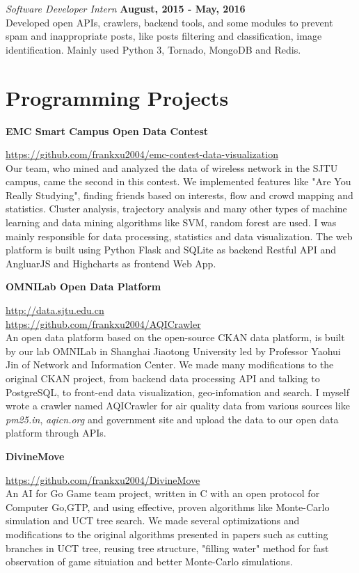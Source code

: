 \documentclass[margin,line]{res}
\begin{document}
\begin{resume}
\vspace{-.3cm}
{\em Software Developer Intern} \hfill {\bf August, 2015 - May, 2016}\\
Developed open APIs, crawlers, backend tools, and some modules to prevent spam and inappropriate posts, like posts filtering and classification, image identification. Mainly used Python 3, Tornado, MongoDB and Redis.

\section{\sc Programming Projects}
{\bf EMC Smart Campus Open Data Contest}

\vspace{-.3cm}
\url{https://github.com/frankxu2004/emc-contest-data-visualization}\\
Our team, who mined and analyzed the data of wireless network in the SJTU campus, came the second in this contest. We implemented features like "Are You Really Studying", finding friends based on interests, flow and crowd mapping and statistics. Cluster analysis, trajectory analysis and many other types of machine learning and data mining algorithms like SVM, random forest are used. I was mainly responsible for data processing, statistics and data visualization. The web platform is built using Python Flask and SQLite as backend Restful API and AngluarJS and Highcharts as frontend Web App.

{\bf OMNILab Open Data Platform}

\vspace{-.3cm}
\url{http://data.sjtu.edu.cn}\\
\url{https://github.com/frankxu2004/AQICrawler}\\
An open data platform based on the open-source CKAN data platform, is built by our lab OMNILab in Shanghai Jiaotong University led by Professor Yaohui Jin of Network and Information Center. We made many modifications to the original CKAN project, from backend data processing API and talking to PostgreSQL, to front-end data visualization, geo-infomation and search. I myself wrote a crawler named AQICrawler for air quality data from various sources like \textit{pm25.in}, \textit{aqicn.org} and government site and upload the data to our open data platform through APIs.

{\bf DivineMove}

\vspace{-.3cm}
\url{https://github.com/frankxu2004/DivineMove}\\
An AI for Go Game team project, written in C with an open protocol for Computer Go,GTP, and using effective, proven algorithms like Monte-Carlo simulation and UCT tree search. We made several optimizations and modifications to the original algorithms presented in papers such as cutting branches in UCT tree, reusing tree structure, "filling water" method for fast observation of game situiation and better Monte-Carlo simulations.



\end{resume}
\end{document}

